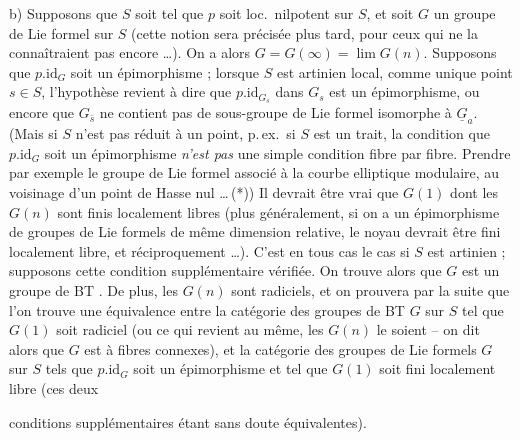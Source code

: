 \documentclass[11pt,a4paper]{article}
\begin{document}
b) Supposons que $S$ soit  tel que $p$ soit loc.\ nilpotent sur $S$, et soit $G$ un groupe de Lie formel sur $S$ (cette notion sera précisée plus tard, pour ceux qui ne la connaîtraient pas encore \ldots). On a alors $G = G(\infty) = \lim G(n)$. Supposons que $p.\mathrm{id}_G$ soit un épimorphisme ; lorsque $S$ est artinien local, comme unique point $s \in S$, l'hypothèse revient à dire que $p.\mathrm{id}_{G_s}$ dans $G_s$ est un épimorphisme, ou encore que $G_{\bar s}$ ne contient pas de sous-groupe de Lie formel isomorphe à $\underline{G}_a$. (Mais si $S$ n'est pas réduit à un point, p.\,ex.\ si $S$ est un trait, la condition que $p.\mathrm{id}_G$ soit un épimorphisme \emph{n'est pas} une simple condition fibre par fibre. Prendre par exemple le groupe de Lie formel associé  à la courbe elliptique modulaire, au voisinage d'un point de Hasse nul \ldots\,(*)) Il devrait être vrai que  $G(1)$ dont les $G(n)$ sont finis localement libres (plus généralement, si on a un épimorphisme de groupes de Lie formels de même dimension relative, le noyau devrait être fini localement libre, et réciproquement \ldots). C'est en tous cas le cas si $S$ est artinien ; supposons cette condition supplémentaire vérifiée. On trouve alors que $G$ est un groupe de BT . De plus, les $G(n)$ sont radiciels, et on prouvera par la suite que l'on trouve une équivalence entre la catégorie des groupes de BT $G$ sur $S$ tel que $G(1)$ soit radiciel (ou ce qui revient au même, les $G(n)$ le soient -- on dit alors que $G$ est à fibres connexes), et la catégorie des groupes de Lie formels $G$ sur $S$ tels que $p.\mathrm{id}_G$ soit un épimorphisme et tel que $G(1)$ soit fini localement libre (ces deux

conditions supplémentaires étant sans doute équivalentes).
\end{document}
